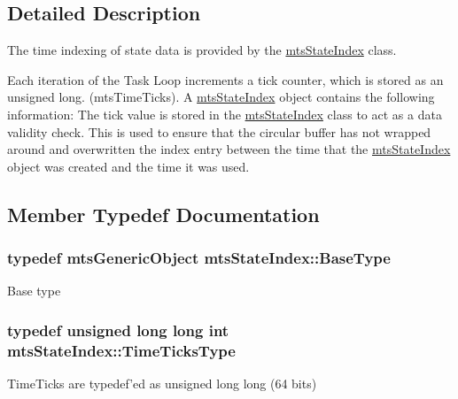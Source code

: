 \subsection{Detailed Description}
The time indexing of state data is provided by the \hyperlink{classmts_state_index}{mts\-State\-Index} class.

Each iteration of the Task Loop increments a tick counter, which is stored as an unsigned long. (mts\-Time\-Ticks). A \hyperlink{classmts_state_index}{mts\-State\-Index} object contains the following information\-: The tick value is stored in the \hyperlink{classmts_state_index}{mts\-State\-Index} class to act as a data validity check. This is used to ensure that the circular buffer has not wrapped around and overwritten the index entry between the time that the \hyperlink{classmts_state_index}{mts\-State\-Index} object was created and the time it was used. 

\subsection{Member Typedef Documentation}
\hypertarget{classmts_state_index_a9b228c6cd3d48921c5253fd6b1a95800}{
\subsubsection[{Base\-Type}]{\setlength{\rightskip}{0pt plus 5cm}typedef {\bf mts\-Generic\-Object} {\bf mts\-State\-Index\-::\-Base\-Type}}}\label{classmts_state_index_a9b228c6cd3d48921c5253fd6b1a95800}
Base type \hypertarget{classmts_state_index_a80d0a5acdec3b616347ddea2912b6294}{
\subsubsection[{Time\-Ticks\-Type}]{\setlength{\rightskip}{0pt plus 5cm}typedef unsigned long long int {\bf mts\-State\-Index\-::\-Time\-Ticks\-Type}}}\label{classmts_state_index_a80d0a5acdec3b616347ddea2912b6294}
Time\-Ticks are typedef'ed as unsigned long long (64 bits) 

